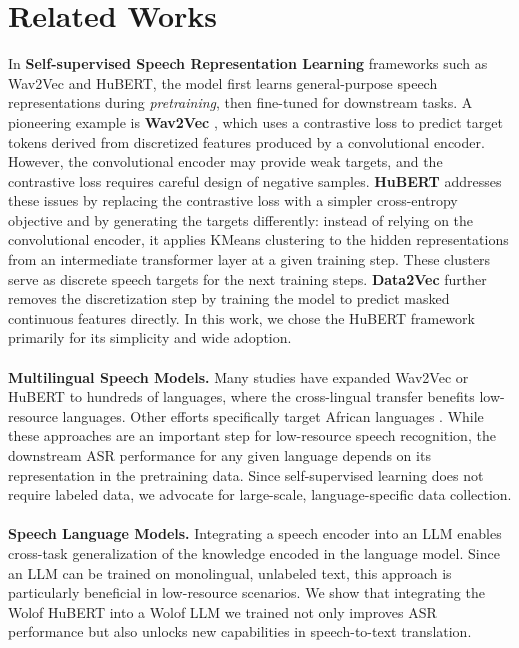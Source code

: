 \documentclass{article}
\newcommand{\myparagraph}[1]{\noindent\textbf{#1}}
\begin{document}
\section{Related Works}
In \myparagraph{Self-supervised Speech Representation Learning} frameworks such as Wav2Vec and HuBERT, the model first learns general-purpose speech representations during \textit{pretraining}, then fine-tuned for downstream tasks. A pioneering example is \textbf{Wav2Vec} \cite{wav2vec, wav2vec2}, which uses a contrastive loss to predict target tokens derived from discretized features produced by a convolutional encoder. However, the convolutional encoder may provide weak targets, and the contrastive loss requires careful design of negative samples. \textbf{HuBERT} \cite{hubert} addresses these issues by replacing the contrastive loss with a simpler cross-entropy objective and by generating the targets differently: instead of relying on the convolutional encoder, it applies KMeans clustering to the hidden representations from an intermediate transformer layer at a given training step. These clusters serve as discrete speech targets for the next training steps. \textbf{Data2Vec} \cite{baevski2023efficientselfsupervisedlearningcontextualized} further removes the discretization step by training the model to predict masked continuous features directly. In this work, we chose the HuBERT framework primarily for its simplicity and wide adoption.
\\
\\
\myparagraph{Multilingual Speech Models.} Many studies \cite{xlsr, mhubert} have expanded Wav2Vec or HuBERT to hundreds of languages, where the cross-lingual transfer benefits low-resource languages. Other efforts specifically target African languages \cite{gauthierSSL, afrihubert}. While these approaches are an important step for low-resource speech recognition, the downstream ASR performance for any given language depends on its representation in the pretraining data. Since self-supervised learning does not require labeled data, we advocate for large-scale, language-specific data collection.
\\
\\
\myparagraph{Speech Language Models.} Integrating a speech encoder into an LLM \cite{slm_methods, llamaspeech} enables cross-task generalization of the knowledge encoded in the language model. Since an LLM can be trained on monolingual, unlabeled text, this approach is particularly beneficial in low-resource scenarios. We show that integrating the Wolof HuBERT into a Wolof LLM we trained not only improves ASR performance but also unlocks new capabilities in speech-to-text translation.
\end{document}
